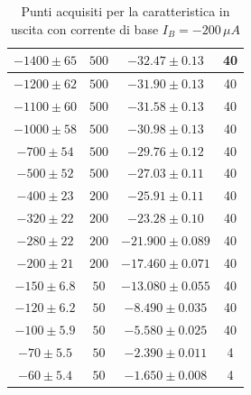 \documentclass[]{article}
\begin{document}
\begin{table}[H]
\begin{tabular}{|c|c|c|c|}
		\hline
		$ -1400\pm 65 $ &$ 500 $ & $ -32.47\pm 0.13 $ &40 \\
		\hline
		$ -1200\pm 62 $ &$ 500 $ & $ -31.90\pm 0.13 $ &40 \\
		\hline
		$ -1100\pm 60 $ &$ 500 $ & $ -31.58\pm 0.13 $ &40 \\
		\hline
		$ -1000\pm 58 $ &$ 500 $ & $ -30.98\pm 0.13 $ &40 \\
		\hline
		$ -700\pm 54 $ &$ 500 $ & $ -29.76\pm 0.12 $ &40 \\
		\hline
		$ -500\pm 52 $ &$ 500 $ & $ -27.03\pm 0.11 $ &40 \\
		\hline
		$ -400\pm 23 $ &$ 200 $ & $ -25.91\pm 0.11 $ &40 \\
		\hline
		$ -320\pm 22 $ &$ 200 $ & $-23.28\pm 0.10 $ &40 \\
		\hline
		$-280\pm 22 $ &$ 200 $ & $ -21.900\pm 0.089 $ &40 \\
		\hline
		$ -200\pm 21 $ &$ 200 $ & $ -17.460\pm 0.071 $ &40 \\
		\hline
		$ -150\pm 6.8 $ &$ 50 $ & $ -13.080\pm 0.055 $ &40 \\
		\hline
		$ -120\pm 6.2 $ &$ 50 $ & $ -8.490\pm 0.035 $ &40 \\
		\hline
		$ -100\pm 5.9 $ &$ 50 $ & $ -5.580\pm 0.025 $ &40 \\
		\hline
		$ -70\pm 5.5 $ &$ 50 $ & $ -2.390\pm 0.011 $ &4 \\
		\hline
		$ -60\pm 5.4 $ &$ 50 $ & $ -1.650\pm 0.008 $ &4 \\
		\hline
	\end{tabular}
		\caption{Punti acquisiti per la caratteristica in uscita con corrente di base $ I_{B}= -200\, \mu A $}
		\label{tab:200muA}
	\end{table}
\end{document}
